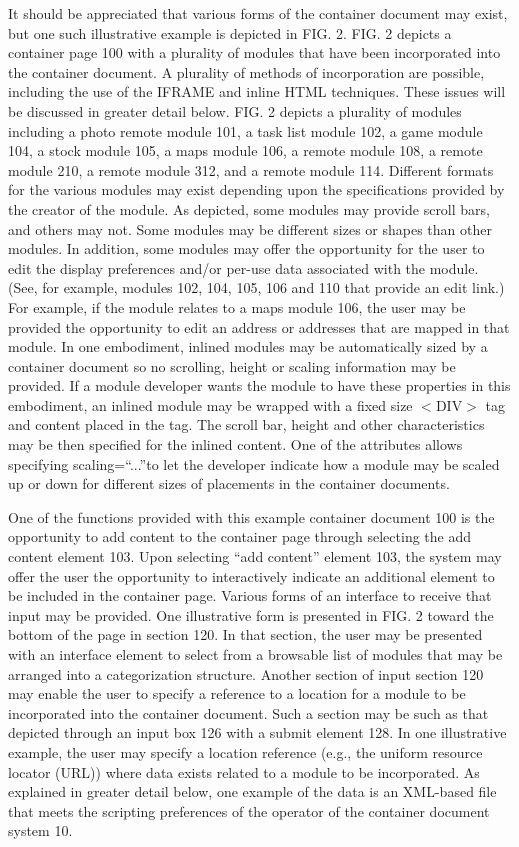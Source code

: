 It should be appreciated that various
forms of the container document may exist, but one such illustrative
example is depicted in FIG. 2. FIG. 2 depicts a container page
100 with a plurality of modules that have been incorporated
into the container document. A plurality of methods of incorporation
are possible, including the use of the IFRAME and inline HTML
techniques. These issues will be discussed in greater detail
below. FIG. 2 depicts a plurality of modules including a photo remote
module 101, a task list module 102, a game module
104, a stock module 105, a maps module 106, a
remote module 108, a remote module 210, a remote module
312, and a remote module 114. Different formats for the
various modules may exist depending upon the specifications provided
by the creator of the module. As depicted, some modules may provide
scroll bars, and others may not. Some modules may be different sizes
or shapes than other modules. In addition, some modules may offer the
opportunity for the user to edit the display preferences and/or
per-use data associated with the module. (See, for example, modules
102, 104, 105, 106 and 110 that
provide an edit link.) For example, if the module relates to a maps
module 106, the user may be provided the opportunity to edit an
address or addresses that are mapped in that module. In one
embodiment, inlined modules may be automatically sized by a container
document so no scrolling, height or scaling information may be
provided. If a module developer wants the module to have these
properties in this embodiment, an inlined module may be wrapped with a
fixed size $<$DIV$>$ tag and content placed in the tag. The
scroll bar, height and other characteristics may be then specified for
the inlined content. One of the attributes allows specifying
scaling=``...''to let the developer indicate how a
module may be scaled up or down for different sizes of placements in
the container documents.



One of the functions
provided with this example container document 100 is the
opportunity to add content to the container page through selecting the
add content element 103. Upon selecting ``add
content'' element 103, the system may offer the user the
opportunity to interactively indicate an additional element to be
included in the container page. Various forms of an interface to
receive that input may be provided. One illustrative form is presented
in FIG. 2 toward the bottom of the page in section 120. In that
section, the user may be presented with an interface element to select
from a browsable list of modules that may be arranged into a
categorization structure. Another section of input section 120
may enable the user to specify a reference to a location for a module
to be incorporated into the container document. Such a section may be
such as that depicted through an input box 126 with a submit
element 128. In one illustrative example, the user may specify
a location reference (e.g., the uniform resource locator (URL)) where
data exists related to a module to be incorporated. As explained in
greater detail below, one example of the data is an XML-based file
that meets the scripting preferences of the operator of the container
document system 10.



